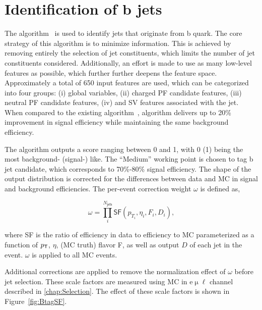 \section{Identification of b jets}
\label{sec:Btag}

The \DeepJ algorithm~\cite{Bols:2020bkb} is used to identify jets that originate from b quark. The core strategy of this algorithm is to minimize information. This is achieved by removing entirely the selection of jet constituents, which limits the number of jet constituents considered. Additionally, an effort is made to use as many low-level features as possible, which further further deepens the feature space. Approximately a total of 650 input features are used, which can be categorized into four groups: (i) global variables, (ii) charged \ac{PF} candidate features, (iii) neutral \ac{PF} candidate features, (iv) and \ac{SV} features associated with the jet. When compared to the existing \DeepC algorithm~\cite{CMS:2017wtu}, \DeepJ algorithm delivers up to 20\% improvement in signal efficiency while maintaining the same background efficiency.

The \DeepJ algorithm outputs a score ranging between 0 and 1, with 0 (1) being the most background- (signal-) like. The ``Medium'' working point is chosen to tag b jet candidate, which corresponds to 70\%-80\% signal efficiency. The shape of the \DeepJ output distribution is corrected for the differences between data and \ac{MC} in signal and background efficiencies. The per-event correction weight $ \omega$ is defined as,
 
 \begin{equation}
 \omega = \prod_{i}^{N_{\textsf{jets}}} \textsf{SF}(p_{T_{i}},\eta_i, F_i, D_i),
 \end{equation}
 
where \textsf{SF} is the ratio of efficiency in data to efficiency to \ac{MC} parameterized as a function of $p_{\textsf{T}}$, $\eta$, (\ac{MC} truth) flavor F, as well as \DeepJ output $D$ of each jet in the event. $\omega$ is applied to all \ac{MC} events.

Additional corrections are applied to remove the normalization effect of $\omega$ before jet selection. These scale factors are measured using \ac{MC} in e$\upmu\ell$ channel described in \autoref{chap:Selection}. The effect of these scale factors is shown in Figure~\ref{fig:BtagSF}.
 
